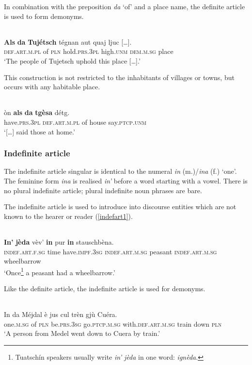 In combination with the preposition \textit{da} ‘of’ and a place name, the definite article is used to form demonyms.

\ea
\label{}
\\
\gll    \textbf{Als} \textbf{da} \textbf{Tujétsch} tégnan aut quaj ljuc […].\\
    \textsc{def.art.m.pl} of \textsc{pln} hold.\textsc{prs.3pl} high.\textsc{unm} \textsc{dem.m.sg} place\\
\glt `The people of Tujetsch uphold this place […].'
\z

This construction is not restricted to the inhabitants of villages or towns, but occurs with any habitable place.

\ea\label{}
\\
\gll […] òn \textbf{als} \textbf{da} \textbf{tgèsa} détg.\\
{} have.\textsc{prs.3pl} \textsc{def.art.m.pl} of house say.\textsc{ptcp.unm}\\
\glt `[…] said those at home.'
\z


\subsubsection{Indefinite article}
The indefinite article singular is identical to the numeral \textit{in} (m.)/\textit{ina} (f.) ‘one’. The feminine form \textit{ina} is realised \textit{in'} before a word starting with a vowel. There is no plural indefinite article; plural indefinite noun phrases are bare.

The indefinite article is used to introduce into discourse entities which are not known to the hearer or reader  (\ref{indefart1}). 

\ea\label{indefart1}
\\
\gll \textbf{In'} \textbf{jèda} vèv’ \textbf{in} pur \textbf{in} stauschbèna.\\
     \textsc{indef.art.f.sg} time have.\textsc{impf.3sg} \textsc{indef.art.m.sg} peasant \textsc{indef.art.m.sg} wheelbarrow \\
\glt `Once\footnote{Tuatschín speakers usually write \textit{in' jèda} in one word: \textit{ignèda}.} a peasant had a wheelbarrow.'
\z

Like the definite article, the indefinite article is used for demonyms.

\ea\label{}
\\
\gll   In da Méjdal è jus cul trèn gjù Cuéra.\\
     one.\textsc{m.sg} of \textsc{pln} be.\textsc{prs.3sg} go.\textsc{ptcp.m.sg} with.\textsc{def.art.m.sg} train down \textsc{pln}\\
\glt `A person from Medel went down to Cuera by train.'
\z

